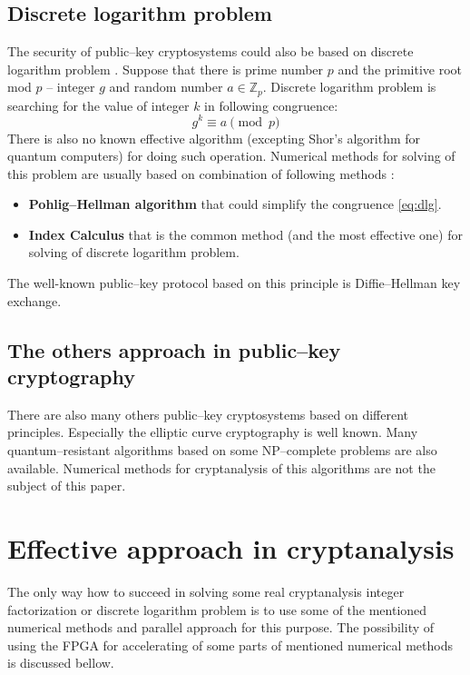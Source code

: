 \documentclass[conference]{IEEEtran}
\begin{document}
\subsection{Discrete logarithm problem}
The security of public--key cryptosystems could also be based on discrete logarithm problem \cite{delfs}. Suppose that there is prime number $p$ and the primitive root mod $p$ -- integer $g$ and random number $a \in \mathbb{Z}_p$. Discrete logarithm problem is searching for the value of integer $k$ in following congruence:
\begin{equation} \label{eq:dlg}
g^k \equiv a \pmod{p}
\end{equation}
There is also no known effective algorithm (excepting Shor's algorithm for quantum computers) for doing such operation. Numerical methods for solving of this problem are usually based on combination of following methods \cite{yan}: 
\begin{itemize}
\item \textbf{Pohlig--Hellman algorithm} that could simplify the congruence \eqref{eq:dlg}.
\item \textbf{Index Calculus} that is the common method (and the most effective one) for solving of discrete logarithm problem.
\end{itemize}

The well-known public--key protocol based on this principle is Diffie--Hellman key exchange.

\subsection{The others approach in public--key cryptography}
There are also many others public--key cryptosystems based on different principles. Especially the elliptic curve cryptography is well known. Many quantum--resistant algorithms based on some NP--complete problems are also available. Numerical methods for cryptanalysis of this algorithms are not the subject of this paper.

\section{Effective approach in cryptanalysis}
The only way how to succeed in solving some real cryptanalysis integer factorization or discrete logarithm problem is to use some of the mentioned numerical methods and parallel approach for this purpose. The possibility of using the FPGA for accelerating of some parts of mentioned numerical methods is discussed bellow.
\end{document}
